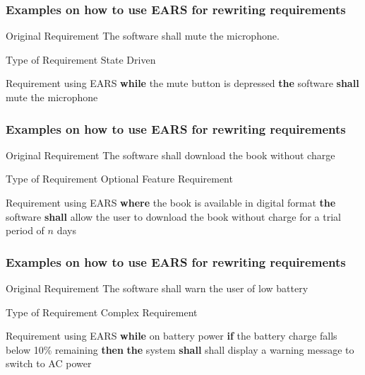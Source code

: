 \documentclass[aspectratio=169]{beamer}
\newcommand{\earss}[3]{{\bf \color{mygreen}while} {#1} {\bf \color{mypurple}the} {#2} {\bf \color{mypurple}shall} {#3}}
\newcommand{\earso}[3]{{\bf \color{mygreen}where} {#1} {\bf \color{mypurple}the} {#2} {\bf \color{mypurple}shall} {#3}}
\newcommand{\earsw}[3]{{\bf \color{mygreen}if} {#1} {\bf \color{mygreen}then} {\bf \color{mypurple}the} {#2} {\bf \color{mypurple}shall} {#3}}
\begin{document}
\begin{frame}
  \frametitle{Examples on how to use EARS for rewriting requirements}
  \begin{block}{Original Requirement}
    The software shall mute the microphone.
  \end{block}
  \begin{block}{Type of Requirement}
  State Driven 
  \end{block}
  \begin{block}{Requirement using EARS}
    \earss{the mute button is depressed}{software}{mute the microphone}
  \end{block}
\end{frame}

\begin{frame}
  \frametitle{Examples on how to use EARS for rewriting requirements}
  \begin{block}{Original Requirement}
    The software shall download the book without charge
  \end{block}
  \begin{block}{Type of Requirement}
  Optional Feature Requirement 
  \end{block}
  \begin{block}{Requirement using EARS}
    \earso{the book is available in digital format}{software}{allow the user to download the book without charge for a trial period of $n$ days}
  \end{block}
\end{frame}

\begin{frame}
  \frametitle{Examples on how to use EARS for rewriting requirements}
  \begin{block}{Original Requirement}
    The software shall warn the user of low battery
  \end{block}
  \begin{block}{Type of Requirement}
  Complex Requirement 
  \end{block}
  \begin{block}{Requirement using EARS}
    {\bf \color{mygreen}while} on battery power \earsw{the battery charge falls below 10\%
remaining}{system}{shall display a warning message to switch to AC power}
  \end{block}
\end{frame}

%    
%    
\end{document}
